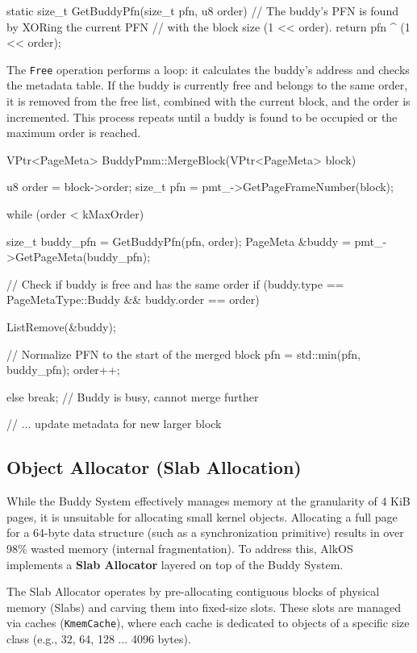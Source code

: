 \documentclass[a4paper,10pt,twoside]{report}
\theoremstyle{definition}
\begin{document}
\begin{cppcode}[caption={Calculating Buddy PFN}, label={lst:buddy_xor}]
static size_t GetBuddyPfn(size_t pfn, u8 order)
{
    // The buddy's PFN is found by XORing the current PFN 
    // with the block size (1 << order).
    return pfn ^ (1 << order);
}
\end{cppcode}

The \texttt{Free} operation performs a loop: it calculates the buddy's address and checks the metadata table. If the buddy is currently free and belongs to the same order, it is removed from the free list, combined with the current block, and the order is incremented. This process repeats until a buddy is found to be occupied or the maximum order is reached.

\begin{cppcode}[caption={Coalescing Logic}, label={lst:buddy_merge}]
VPtr<PageMeta> BuddyPmm::MergeBlock(VPtr<PageMeta> block)
{
    u8 order = block->order;
    size_t pfn = pmt_->GetPageFrameNumber(block);

    while (order < kMaxOrder) {
        size_t buddy_pfn = GetBuddyPfn(pfn, order);
        PageMeta &buddy = pmt_->GetPageMeta(buddy_pfn);

        // Check if buddy is free and has the same order
        if (buddy.type == PageMetaType::Buddy && buddy.order == order) {
            ListRemove(&buddy);
            
            // Normalize PFN to the start of the merged block
            pfn = std::min(pfn, buddy_pfn);
            order++;
        } else {
            break; // Buddy is busy, cannot merge further
        }
    }
    
    // ... update metadata for new larger block
}
\end{cppcode}


\subsection{Object Allocator (Slab Allocation)}

While the Buddy System effectively manages memory at the granularity of 4 KiB pages, it is unsuitable for allocating small kernel objects. Allocating a full page for a 64-byte data structure (such as a synchronization primitive) results in over 98\% wasted memory (internal fragmentation). To address this, AlkOS implements a \textbf{Slab Allocator} layered on top of the Buddy System.

The Slab Allocator operates by pre-allocating contiguous blocks of physical memory (Slabs) and carving them into fixed-size slots. These slots are managed via caches (\texttt{KmemCache}), where each cache is dedicated to objects of a specific size class (e.g., 32, 64, 128 ... 4096 bytes).
\end{document}
